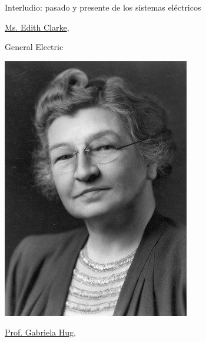 \documentclass[aspectratio=169, usenames,svgnames,dvipsnames]{beamer}
\begin{document}

\begin{frame}{Interludio: \hspace{8mm}pasado y presente de los sistemas eléctricos}    
    \begin{minipage}[c]{0.25\linewidth}
        \begin{center}            
            \vspace{3mm}
            \href{https://www.youtube.com/watch?v=aefuvLBxQyM}{Ms. Edith Clarke}, 
            
            General Electric

            \vspace{3mm}
            \includegraphics[width=1\linewidth]{../figs/edith_clarke.jpg}
        \end{center}
    \end{minipage}
    \hfill%
    \begin{minipage}[c]{0.3\linewidth}
        \begin{center}    
            \vspace{-4mm}
            \href{https://www.youtube.com/watch?v=Sr4qD9G8jeY}{Prof. Gabriela Hug}, 
            

\end{center}
\end{minipage}
\end{frame}
\end{document}
